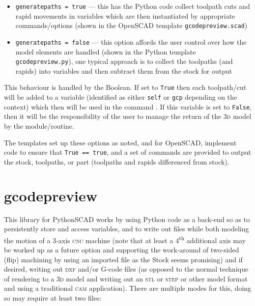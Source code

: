 \documentclass{ltxdoc}
\begin{document}
\begin{itemize}
\item \verb|generatepaths = true| --- this has the Python code collect toolpath cuts and rapid movements in variables which are then instantiated by appropriate commands/options (shown in the OpenSCAD template \verb|gcodepreview.scad|)
\item \verb|generatepaths = false| --- this option affords the user control over how the model elements are handled (shown in the Python template \verb|gcodepreview.py|), one typical approach is to collect the toolpaths (and rapids) into variables and then subtract them from the stock for output
\end{itemize}

\noindent This behaviour is handled by the  Boolean. If set to \verb|True| then each toolpath/cut will be added to a  variable (identified as either \verb|self| or \verb|gcp| depending on the context) which then will be used in the command . If this variable is set to \verb|False|, then it will be the responsibility of the user to manage the return of the \textsc{3d} model by the module/routine.

The templates set up these options as noted, and for OpenSCAD, implement code to ensure that \verb|True == true|, and a set of commands are provided to output the stock, toolpaths, or part (toolpaths and rapids differenced from stock).

\section{gcodepreview}

This library for PythonSCAD works by using Python code as a back-end so as to persistently store and access variables, and to write out files while both modeling the motion of a 3-axis \textsc{cnc} machine (note that at least a 4\textsuperscript{th} additional axis may be worked up as a future option and supporting the work-around of two-sided (flip) machining by using an imported file as the Stock seems promising) and if desired, writing out \textsc{dxf} and/or G-code files (as opposed to the normal technique of rendering to a \textsc{3d} model and writing out an \textsc{stl} or \textsc{step} or other model format and using a traditional \textsc{cam} application). There are multiple modes for this, doing so may require at least two files:
\end{document}
